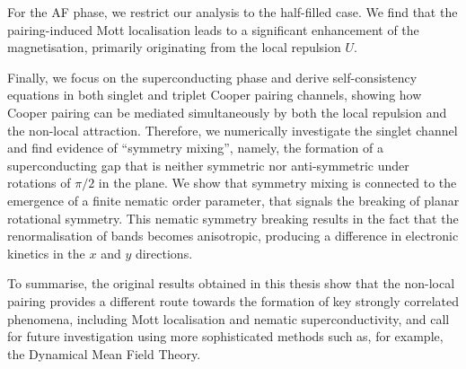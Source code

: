 \documentclass[a4paper]{memoir}
\begin{document}
For the AF phase, we restrict our analysis to the half-filled case. We find that the pairing-induced Mott localisation leads to a significant enhancement of the magnetisation, primarily originating from the local repulsion $U$.

Finally, we focus on the superconducting phase and derive self-consistency equations in both singlet and triplet Cooper pairing channels, showing how Cooper pairing can be mediated simultaneously by both the local repulsion and the non-local attraction. Therefore, we numerically investigate the singlet channel and find evidence of ``symmetry mixing'', namely, the formation of a superconducting gap that is neither symmetric nor anti-symmetric under rotations of $\pi/2$ in the plane. We show that symmetry mixing is connected to the emergence of a finite nematic order parameter, that signals the breaking of planar rotational symmetry. This nematic symmetry breaking results in the fact that the renormalisation of bands becomes anisotropic, producing a difference in electronic kinetics in the $x$ and $y$ directions.

To summarise, the original results obtained in this thesis show that the non-local pairing provides a different route towards the formation of key strongly correlated phenomena, including Mott localisation and nematic superconductivity, and call for future investigation using more sophisticated methods such as, for example, the Dynamical Mean Field Theory.
\end{document}
